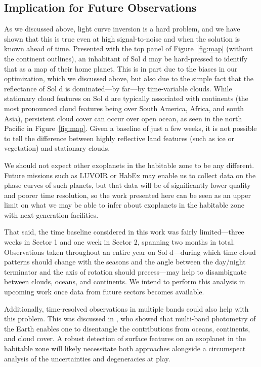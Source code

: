 \documentclass[modern]{aastex62}
\begin{document}
\subsection{Implication for Future Observations}
\label{sec:otherplanets}

As we discussed above, light curve inversion is a hard problem,
and we have shown that this is true even at high signal-to-noise and 
when the solution is
known ahead of time. Presented with the top panel of Figure~\ref{fig:map}
(without the continent outlines),
an inhabitant of Sol d may be hard-pressed to identify that
as a map of their home planet. This is in part due to the biases
in our optimization, which we discussed above, but also due to the 
simple fact that the reflectance of Sol d is dominated---by far---by 
time-variable clouds. While stationary cloud features on Sol d are
typically associated with continents (the most pronounced cloud features
being over South America, Africa, and south Asia), persistent cloud
cover can occur over open ocean, as seen in the north Pacific
in Figure~\ref{fig:map}. Given a baseline of just a few weeks, it is
not possible to tell the difference between highly reflective land
features (such as ice or vegetation) and stationary clouds.

We should not expect other exoplanets in the habitable zone to be
any different. Future missions such as LUVOIR or HabEx may enable
us to collect data on the phase curves of such planets, but that
data will be of significantly lower quality and poorer time resolution,
so the work presented here can be seen as an upper limit on what we may
be able to infer about exoplanets in the habitable zone with
next-generation facilities.

That said, the time baseline considered in this work was fairly
limited---three weeks in Sector 1 and one week in Sector 2,
spanning two months in total. Observations taken throughout an entire
year on Sol d---during which time cloud patterns should change with the
seasons and the angle between the day/night terminator and the 
axis of rotation should precess---may help to disambiguate between
clouds, oceans, and continents. We intend to perform this analysis
in upcoming work once data from future \TESS sectors becomes available.

Additionally, time-resolved observations in multiple bands could
also help with this problem. This was discussed in \cite{Cowan2009},
who showed that multi-band photometry of the Earth enables one to
disentangle the contributions from oceans, continents, and cloud cover.
A robust detection of surface features on an exoplanet in the habitable
zone will likely necessitate both approaches alongside a circumspect
analysis of the uncertainties and degeneracies at play.
\end{document}
